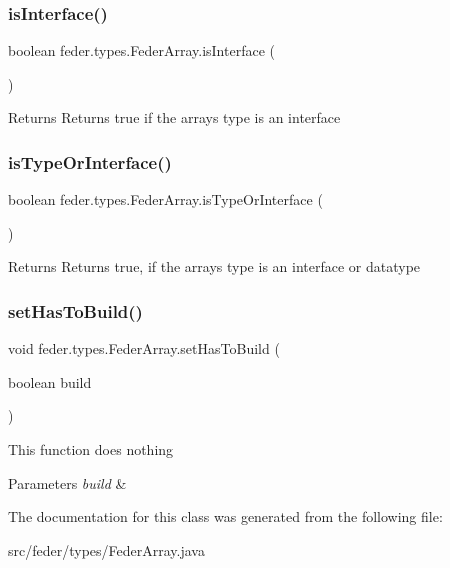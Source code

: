 \subsubsection{\texorpdfstring{is\+Interface()}{isInterface()}}
{\footnotesize\ttfamily boolean feder.\+types.\+Feder\+Array.\+is\+Interface (\begin{DoxyParamCaption}{ }\end{DoxyParamCaption})}

\begin{DoxyReturn}{Returns}
Returns true if the array\textquotesingle{}s type is an interface 
\end{DoxyReturn}
\mbox{\label{classfeder_1_1types_1_1FederArray_a2defe214b433edc0169246e2f028c3fc}} 
\subsubsection{\texorpdfstring{is\+Type\+Or\+Interface()}{isTypeOrInterface()}}
{\footnotesize\ttfamily boolean feder.\+types.\+Feder\+Array.\+is\+Type\+Or\+Interface (\begin{DoxyParamCaption}{ }\end{DoxyParamCaption})}

\begin{DoxyReturn}{Returns}
Returns true, if the array\textquotesingle{}s type is an interface or datatype 
\end{DoxyReturn}
\mbox{\label{classfeder_1_1types_1_1FederArray_a44cbed29acf49dde8b64bcc05d3d6943}} 
\subsubsection{\texorpdfstring{set\+Has\+To\+Build()}{setHasToBuild()}}
{\footnotesize\ttfamily void feder.\+types.\+Feder\+Array.\+set\+Has\+To\+Build (\begin{DoxyParamCaption}\item[{boolean}]{build }\end{DoxyParamCaption})}

This function does nothing 
\begin{DoxyParams}{Parameters}
{\em build} & \\
\hline
\end{DoxyParams}


The documentation for this class was generated from the following file\+:\begin{DoxyCompactItemize}
\item 
src/feder/types/Feder\+Array.\+java\end{DoxyCompactItemize}

